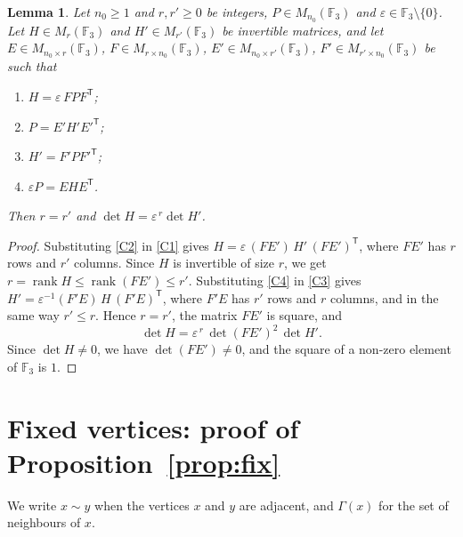 \documentclass[11pt,a4paper]{article}
\newtheorem{lemma}[theorem]{Lemma}
\theoremstyle{remark}
\newcommand{\FF}{\mathbb{F}}
\newcommand{\tp}{\mathsf{T}}
\begin{document}
\begin{lemma}\label{lem:F3}
Let $n_0\ge1$ and $r,r'\ge0$ be integers, $P\in M_{n_0}(\FF_3)$ and $\varepsilon\in\FF_3\setminus\{0\}$. Let
$H\in M_r(\FF_3)$ and $H'\in M_{r'}(\FF_3)$ be invertible matrices, and let $E\in M_{n_0\times r}(\FF_3)$,
$F\in M_{r\times n_0}(\FF_3)$, $E'\in M_{n_0\times r'}(\FF_3)$, $F'\in M_{r'\times n_0}(\FF_3)$ be such that
\begin{enumerate}[label=(C\arabic*),leftmargin=3em]
\item\label{C1} $H=\varepsilon\,FPF^{\tp}$;
\item\label{C2} $P=E'H'E'^{\tp}$;
\item\label{C3} $H'=F'PF'^{\tp}$;
\item\label{C4} $\varepsilon P=EHE^{\tp}$.
\end{enumerate}
Then $r=r'$ and $\det H=\varepsilon^{\,r}\det H'$.
\end{lemma}
\begin{proof}
Substituting \ref{C2} in \ref{C1} gives $H=\varepsilon\,(FE')\,H'\,(FE')^{\tp}$, where $FE'$ has $r$ rows and $r'$
columns. Since $H$ is invertible of size $r$, we get $r=\operatorname{rank}H\le\operatorname{rank}(FE')\le r'$.
Substituting \ref{C4} in \ref{C3} gives $H'=\varepsilon^{-1}(F'E)\,H\,(F'E)^{\tp}$, where $F'E$ has $r'$ rows and
$r$ columns, and in the same way $r'\le r$. Hence $r=r'$, the matrix $FE'$ is square, and
\[
\det H=\varepsilon^{\,r}\,\det(FE')^2\,\det H' .
\]
Since $\det H\ne0$, we have $\det(FE')\ne0$, and the square of a non-zero element of $\FF_3$ is $1$.
\end{proof}

\section{Fixed vertices: proof of Proposition~\ref{prop:fix}}\label{sec:fix}

We write $x\sim y$ when the vertices $x$ and $y$ are adjacent, and $\Gamma(x)$ for the set of neighbours of $x$.
\end{document}
